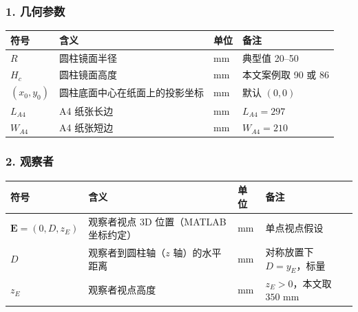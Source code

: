 \documentclass[12pt, a4paper]{ctexart}
\begin{document}
\subsubsection*{1. 几何参数}
\begin{table}[H]
\centering
\begin{tabularx}{\textwidth}{lllX}
\toprule
\textbf{符号} & \textbf{含义} & \textbf{单位} & \textbf{备注} \\
\midrule
$R$ & 圆柱镜面半径 & mm & 典型值 20–50 \\
$H_c$ & 圆柱镜面高度 & mm & 本文案例取 90 或 86 \\
$(x_0, y_0)$ & 圆柱底面中心在纸面上的投影坐标 & mm & 默认 $(0, 0)$ \\
$L_{A4}$ & A4 纸张长边 & mm & $L_{A4} = 297$ \\
$W_{A4}$ & A4 纸张短边 & mm & $W_{A4} = 210$ \\
\bottomrule
\end{tabularx}
\end{table}

\subsubsection*{2. 观察者}
\begin{table}[H]
\centering
\begin{tabularx}{\textwidth}{lllX}
\toprule
\textbf{符号} & \textbf{含义} & \textbf{单位} & \textbf{备注} \\
\midrule
$\mathbf{E} = (0, D, z_E)$ & 观察者视点 3D 位置（MATLAB 坐标约定） & mm & 单点视点假设 \\
$D$ & 观察者到圆柱轴（$z$ 轴）的水平距离 & mm & 对称放置下 $D = y_E$，标量 \\
$z_E$ & 观察者视点高度 & mm & $z_E > 0$，本文取 $350$ mm \\
\bottomrule
\end{tabularx}
\end{table}
\end{document}
